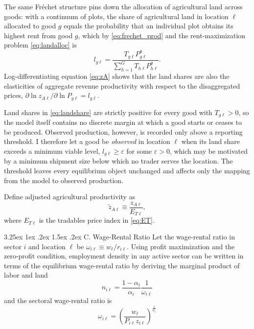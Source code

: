 \documentclass[11pt]{article}
\makeatletter
\renewcommand\paragraph{\@startsection{paragraph}{4}{\z@}%
  {3.25ex \@plus 1ex \@minus .2ex}%
  {1.5ex \@plus .2ex}%
  {\normalfont\normalsize\bfseries}}
\makeatother
\begin{document}
The same Fréchet structure pins down the allocation of agricultural land across goods: with a continuum of plots, the share of agricultural land in location $\ell$ allocated to good $g$ equals the probability that an individual plot obtains its highest rent from good $g$, which by \eqref{eq:frechet_prod} and the rent-maximization problem \eqref{eq:landalloc} is
\begin{equation}
l_{g\ell}
=
\frac{T_{g\ell}P_{g\ell}^\theta}
{\sum_{h=1}^G T_{h\ell}P_{h\ell}^\theta}.
\label{eq:landshare}
\end{equation}
Log-differentiating equation \eqref{eq:zA} shows that the land shares are also the elasticities of aggregate revenue productivity with respect to the disaggregated prices, $\partial \ln z_{A\ell}/\partial \ln P_{g\ell} = l_{g\ell}$.

Land shares in \eqref{eq:landshare} are strictly positive for every good with $T_{g\ell}>0$, so the model itself contains no discrete margin at which a good starts or ceases to be produced. Observed production, however, is recorded only above a reporting threshold. I therefore let a good be \emph{observed} in location $\ell$ when its land share exceeds a minimum viable level, $l_{g\ell}\geq\varepsilon$ for some $\varepsilon>0$, which may be motivated by a minimum shipment size below which no trader serves the location. The threshold leaves every equilibrium object unchanged and affects only the mapping from the model to observed production.

Define adjusted agricultural productivity as
\begin{equation}
\tilde z_{A\ell} \equiv \frac{z_{A\ell}}{E_{T\ell}},
\label{eq:zad}
\end{equation}
where $E_{T\ell}$ is the tradables price index in \eqref{eq:ET}.

\paragraph{C. Wage-Rental Ratio}
Let the wage-rental ratio in sector $i$ and location $\ell$ be $\omega_{i\ell} \equiv w_\ell / r_{i\ell}$. Using profit maximization and the zero-profit condition, employment density in any active sector can be written in terms of the equilibrium wage-rental ratio by deriving the marginal product of labor and land
\begin{equation}
    n_{i\ell}=\frac{1-\alpha_i}{\alpha_i}\frac{1}{\omega_{i\ell}}
    \label{eq:n}
\end{equation}
and the sectoral wage-rental ratio is
\begin{equation}
    \omega_{i\ell}=(\frac{w_\ell}{P_{i\ell}z_{i\ell}})^\frac{1}{\alpha_i}
    \label{eq:omega}
\end{equation}
\end{document}
